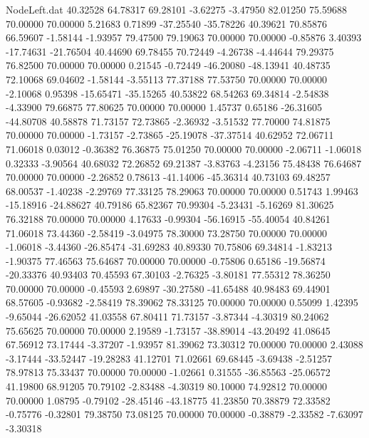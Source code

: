 \begin{filecontents}{NodeLeft.dat}
  40.32528   64.78317   69.28101    -3.62275   -3.47950   82.01250   75.59688   70.00000   70.00000    5.21683    0.71899  -37.25540  -35.78226
  40.39621   70.85876   66.59607    -1.58144   -1.93957   79.47500   79.19063   70.00000   70.00000   -0.85876    3.40393  -17.74631  -21.76504
  40.44690   69.78455   70.72449    -4.26738   -4.44644   79.29375   76.82500   70.00000   70.00000    0.21545   -0.72449  -46.20080  -48.13941
  40.48735   72.10068   69.04602    -1.58144   -3.55113   77.37188   77.53750   70.00000   70.00000   -2.10068    0.95398  -15.65471  -35.15265
  40.53822   68.54263   69.34814    -2.54838   -4.33900   79.66875   77.80625   70.00000   70.00000    1.45737    0.65186  -26.31605  -44.80708
  40.58878   71.73157   72.73865    -2.36932   -3.51532   77.70000   74.81875   70.00000   70.00000   -1.73157   -2.73865  -25.19078  -37.37514
  40.62952   72.06711   71.06018     0.03012   -0.36382   76.36875   75.01250   70.00000   70.00000   -2.06711   -1.06018    0.32333   -3.90564
  40.68032   72.26852   69.21387    -3.83763   -4.23156   75.48438   76.64687   70.00000   70.00000   -2.26852    0.78613  -41.14006  -45.36314
  40.73103   69.48257   68.00537    -1.40238   -2.29769   77.33125   78.29063   70.00000   70.00000    0.51743    1.99463  -15.18916  -24.88627
  40.79186   65.82367   70.99304    -5.23431   -5.16269   81.30625   76.32188   70.00000   70.00000    4.17633   -0.99304  -56.16915  -55.40054
  40.84261   71.06018   73.44360    -2.58419   -3.04975   78.30000   73.28750   70.00000   70.00000   -1.06018   -3.44360  -26.85474  -31.69283
  40.89330   70.75806   69.34814    -1.83213   -1.90375   77.46563   75.64687   70.00000   70.00000   -0.75806    0.65186  -19.56874  -20.33376
  40.93403   70.45593   67.30103    -2.76325   -3.80181   77.55312   78.36250   70.00000   70.00000   -0.45593    2.69897  -30.27580  -41.65488
  40.98483   69.44901   68.57605    -0.93682   -2.58419   78.39062   78.33125   70.00000   70.00000    0.55099    1.42395   -9.65044  -26.62052
  41.03558   67.80411   71.73157    -3.87344   -4.30319   80.24062   75.65625   70.00000   70.00000    2.19589   -1.73157  -38.89014  -43.20492
  41.08645   67.56912   73.17444    -3.37207   -1.93957   81.39062   73.30312   70.00000   70.00000    2.43088   -3.17444  -33.52447  -19.28283
  41.12701   71.02661   69.68445    -3.69438   -2.51257   78.97813   75.33437   70.00000   70.00000   -1.02661    0.31555  -36.85563  -25.06572
  41.19800   68.91205   70.79102    -2.83488   -4.30319   80.10000   74.92812   70.00000   70.00000    1.08795   -0.79102  -28.45146  -43.18775
  41.23850   70.38879   72.33582    -0.75776   -0.32801   79.38750   73.08125   70.00000   70.00000   -0.38879   -2.33582   -7.63097   -3.30318

\end{filecontents}
